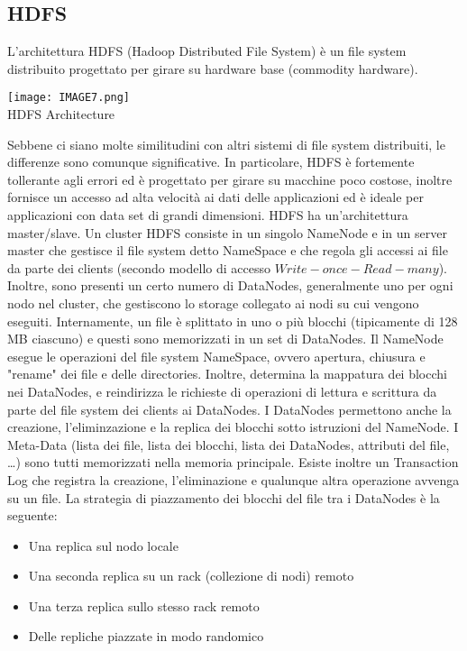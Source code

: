 \documentclass[a4page, 11pt]{article}
\begin{document}
\subsection{HDFS}
L’architettura HDFS (Hadoop Distributed File System) è un file system distribuito progettato per girare su hardware base (commodity hardware).
\begin{center}
	\texttt{[image: IMAGE7.png]}\\
	HDFS Architecture
\end{center}
Sebbene ci siano molte similitudini con altri sistemi di file system distribuiti, le differenze sono comunque significative. In particolare, HDFS è fortemente tollerante agli errori
ed è progettato per girare su macchine poco costose, inoltre fornisce un accesso ad alta velocità ai dati delle applicazioni ed è ideale per applicazioni con data set di grandi dimensioni. HDFS ha un’architettura master/slave. Un cluster HDFS consiste in un singolo NameNode e in un server master che gestisce il file system detto NameSpace e che regola gli accessi ai file da parte dei clients (secondo modello di accesso $Write-once-Read-many$). Inoltre, sono presenti un certo numero di DataNodes, generalmente uno per ogni nodo nel cluster, che gestiscono lo storage collegato ai nodi su cui vengono eseguiti. Internamente, un file è splittato in uno o più blocchi (tipicamente di 128 MB ciascuno) e questi sono memorizzati in un set di DataNodes. Il NameNode esegue le operazioni del file system NameSpace, ovvero apertura, chiusura e "rename" dei file e delle directories. Inoltre, determina la mappatura dei blocchi nei DataNodes, e reindirizza le richieste di operazioni di lettura e scrittura da parte del file system dei clients ai DataNodes. I DataNodes permettono anche la creazione, l’eliminzazione e la replica dei blocchi sotto istruzioni del NameNode. I Meta-Data (lista dei file, lista dei blocchi, lista dei DataNodes, attributi del file, …) sono tutti memorizzati nella memoria principale. Esiste inoltre un Transaction Log che registra la creazione, l’eliminazione e qualunque altra operazione avvenga su un file.
La strategia di piazzamento dei blocchi del file tra i DataNodes è la seguente:
\begin{itemize}[noitemsep]
\item Una replica sul nodo locale
\item Una seconda replica su un rack (collezione di nodi) remoto
\item Una terza replica sullo stesso rack remoto
\item Delle repliche piazzate in modo randomico
\end{itemize}
\end{document}
